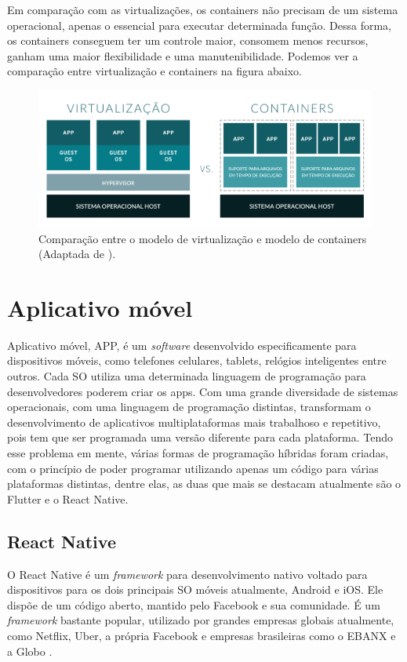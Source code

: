 Em comparação com as virtualizações, os containers não precisam de um sistema operacional, apenas o essencial para executar determinada função. Dessa forma, os containers conseguem ter um controle maior, consomem menos recursos, ganham uma maior flexibilidade e uma manutenibilidade. Podemos ver a comparação entre virtualização e containers na figura abaixo.

\begin{figure}[H]
  \centering
  \includegraphics[width=.80\textwidth]{assets/virtualization-vs-containers.png} 
  \caption{Comparação entre o modelo de virtualização e modelo de containers (Adaptada de \cite{redhat2020Containers}).}
  \label{fig:virtualization-vs-containers}
\end{figure}


\section{Aplicativo móvel}
\label{fund:app}
Aplicativo móvel, APP, é um \textit{software} desenvolvido especificamente para dispositivos móveis, como telefones celulares, tablets, relógios inteligentes entre outros. Cada SO utiliza uma determinada linguagem de programação para desenvolvedores poderem criar os apps. Com uma grande diversidade de sistemas operacionais, com uma linguagem de programação distintas, transformam o desenvolvimento de aplicativos multiplataformas mais trabalhoso e repetitivo, pois tem que ser programada uma versão diferente para cada plataforma. Tendo esse problema em mente, várias formas de programação híbridas foram criadas, com o princípio de poder programar utilizando apenas um código para várias plataformas distintas, dentre elas, as duas que mais se destacam atualmente são o Flutter e o React Native.

\subsection{React Native}
\label{fund:react-native}
O React Native é um \textit{framework} para desenvolvimento nativo voltado para dispositivos para os dois principais SO móveis atualmente, Android e iOS. Ele dispõe de um código aberto, mantido pelo Facebook e sua comunidade. É um \textit{framework} bastante popular, utilizado por grandes empresas globais atualmente, como Netflix, Uber, a própria Facebook e empresas brasileiras como o EBANX e a Globo \cite{empresasbrreact}.

